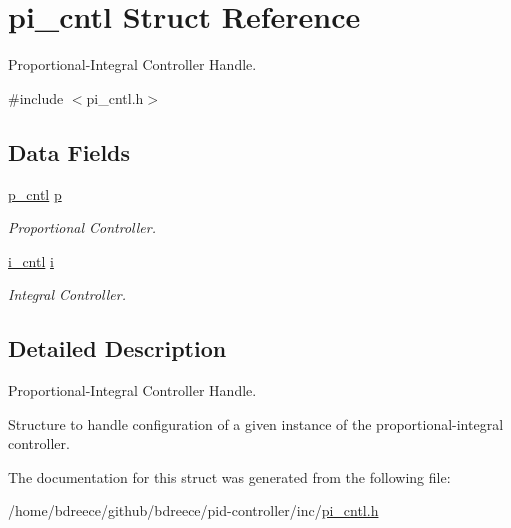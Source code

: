 \hypertarget{structpi__cntl}{}\section{pi\+\_\+cntl Struct Reference}
\label{structpi__cntl}


Proportional-\/\+Integral Controller Handle.  




{\ttfamily \#include $<$pi\+\_\+cntl.\+h$>$}

\subsection*{Data Fields}
\begin{DoxyCompactItemize}
\item 
\mbox{\label{structpi__cntl_a2815892bad227c5447bc088f3b8a79ea}} 
\hyperlink{structp__cntl}{p\+\_\+cntl} \hyperlink{structpi__cntl_a2815892bad227c5447bc088f3b8a79ea}{p}
\begin{DoxyCompactList}\small\item\em Proportional Controller. \end{DoxyCompactList}\item 
\mbox{\label{structpi__cntl_ae0269a7bf51677e3f30134ae1a3e887f}} 
\hyperlink{structi__cntl}{i\+\_\+cntl} \hyperlink{structpi__cntl_ae0269a7bf51677e3f30134ae1a3e887f}{i}
\begin{DoxyCompactList}\small\item\em Integral Controller. \end{DoxyCompactList}\end{DoxyCompactItemize}


\subsection{Detailed Description}
Proportional-\/\+Integral Controller Handle. 

Structure to handle configuration of a given instance of the proportional-\/integral controller. 

The documentation for this struct was generated from the following file\+:\begin{DoxyCompactItemize}
\item 
/home/bdreece/github/bdreece/pid-\/controller/inc/\hyperlink{pi__cntl_8h}{pi\+\_\+cntl.\+h}\end{DoxyCompactItemize}
